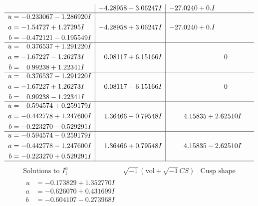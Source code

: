 \documentclass[1p]{elsarticle_modified}
\theoremstyle{definition}
\newcommand{\I}{\sqrt{-1}}
\begin{document}
$$\begin{array}{c|c|c}
 & -4.28958 - 3.06247 I & -27.0240 + 0. I\phantom{ +0.000000I} \\ \hline\begin{aligned}
u &= -0.233067 - 1.286920 I \\
a &= -1.54727 + 1.27295 I \\
b &= -0.472121 - 0.195549 I\end{aligned}
 & -4.28958 + 3.06247 I & -27.0240 + 0. I\phantom{ +0.000000I} \\ \hline\begin{aligned}
u &= \phantom{-}0.376537 + 1.291220 I \\
a &= -1.67227 - 1.26273 I \\
b &= \phantom{-}0.99238 + 1.22341 I\end{aligned}
 & \phantom{-}0.08117 + 6.15166 I & \phantom{-0.000000 } 0 \\ \hline\begin{aligned}
u &= \phantom{-}0.376537 - 1.291220 I \\
a &= -1.67227 + 1.26273 I \\
b &= \phantom{-}0.99238 - 1.22341 I\end{aligned}
 & \phantom{-}0.08117 - 6.15166 I & \phantom{-0.000000 } 0 \\ \hline\begin{aligned}
u &= -0.594574 + 0.259179 I \\
a &= -0.442778 + 1.247600 I \\
b &= -0.223270 - 0.529291 I\end{aligned}
 & \phantom{-}1.36466 - 0.79548 I & \phantom{-}4.15835 + 2.62510 I \\ \hline\begin{aligned}
u &= -0.594574 - 0.259179 I \\
a &= -0.442778 - 1.247600 I \\
b &= -0.223270 + 0.529291 I\end{aligned}
 & \phantom{-}1.36466 + 0.79548 I & \phantom{-}4.15835 - 2.62510 I\\
 \hline 
 \end{array}$$\newpage$$\begin{array}{c|c|c}  
\text{Solutions to }I^u_{1}& \I (\text{vol} + \sqrt{-1}CS) & \text{Cusp shape}\\
 \hline 
\begin{aligned}
u &= -0.173829 + 1.352770 I \\
a &= -0.626070 + 0.431699 I \\
b &= -0.604107 - 0.273968 I\end{aligned}

\end{array}$$
\end{document}
